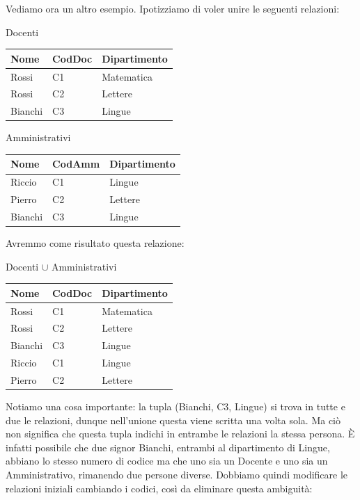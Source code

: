\documentclass[11pt, a4paper, titlepage, oneside]{scrbook}
\begin{document}
Vediamo ora un altro esempio. Ipotizziamo di voler unire le seguenti relazioni:

\begin{minipage}[c]{0.45\textwidth}
\begin{center}
    Docenti

\begin{tabular}{|l|l|l|}
\hline
\textbf{Nome} & \textbf{CodDoc} & \textbf{Dipartimento} \\ \hline
Rossi & C1 & Matematica \\
Rossi & C2 & Lettere \\
Bianchi & C3 & Lingue \\ \hline
\end{tabular}
\end{center}
\end{minipage}\hfill
\begin{minipage}[c]{0.45\textwidth}
\begin{center}
    Amministrativi

\begin{tabular}{|l|l|l|}
\hline
\textbf{Nome} & \textbf{CodAmm} & \textbf{Dipartimento} \\ \hline
Riccio & C1 & Lingue \\
Pierro & C2 & Lettere \\
Bianchi & C3 & Lingue \\ \hline
\end{tabular}
\end{center}
\end{minipage}

Avremmo come risultato questa relazione:

\begin{center}
    Docenti $\cup$ Amministrativi \nopagebreak

\begin{tabular}{|l|l|l|}
\hline
\textbf{Nome} & \textbf{CodDoc} & \textbf{Dipartimento} \\ \hline
Rossi & C1 & Matematica \\
Rossi & C2 & Lettere \\
Bianchi & C3 & Lingue \\
Riccio & C1 & Lingue \\
Pierro & C2 & Lettere \\ \hline
\end{tabular}
\end{center}

Notiamo una cosa importante: la tupla (Bianchi, C3, Lingue) si trova in tutte e due le relazioni, dunque nell'unione questa viene scritta una volta sola. Ma ciò non significa che questa tupla indichi in entrambe le relazioni la stessa persona. È infatti possibile che due signor Bianchi, entrambi al dipartimento di Lingue, abbiano lo stesso numero di codice ma che uno sia un Docente e uno sia un Amministrativo, rimanendo due persone diverse. Dobbiamo quindi modificare le relazioni iniziali cambiando i codici, così da eliminare questa ambiguità:
\end{document}
